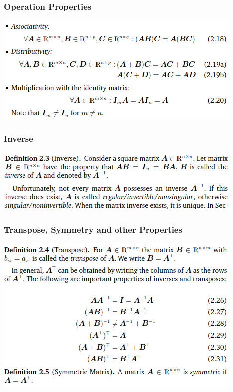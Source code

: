 \documentclass[oneside,10pt]{scrartcl}
\begin{document}
\begin{multicols*}{2}
\subsubsection*{Operation Properties}
\includegraphics[width=\linewidth]{2.2_1}

\subsubsection*{Inverse}
\includegraphics[width=\linewidth]{2.2_2}

\subsubsection*{Transpose, Symmetry and other Properties}
\includegraphics[width=\linewidth]{2.2_3}



\end{multicols*}
\end{document}
